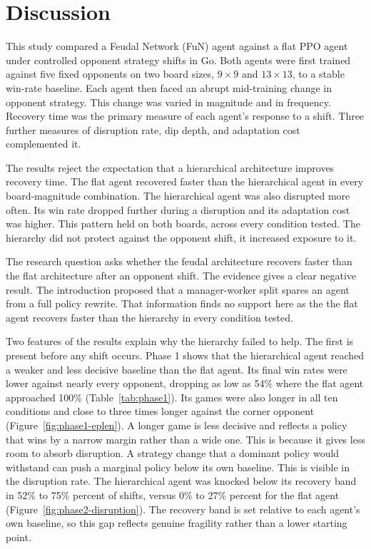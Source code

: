 \documentclass[sigconf,nonacm]{acmart}
\begin{document}
\section{Discussion}

This study compared a Feudal Network (FuN) agent against a flat PPO agent under controlled opponent strategy shifts in Go. Both agents were first trained against five fixed opponents on two board sizes, $9\times9$ and $13\times13$, to a stable win-rate baseline. Each agent then faced an abrupt mid-training change in opponent strategy. This change was varied in magnitude and in frequency. Recovery time was the primary measure of each agent's response to a shift. Three further measures of disruption rate, dip depth, and adaptation cost complemented it.

The results reject the expectation that a hierarchical architecture improves recovery time. The flat agent recovered faster than the hierarchical agent in every board-magnitude combination. The hierarchical agent was also disrupted more often. Its win rate dropped further during a disruption and its adaptation cost was higher. This pattern held on both boards, across every condition tested. The hierarchy did not protect against the opponent shift, it increased exposure to it.

\medskip

The research question asks whether the feudal architecture recovers faster than the flat architecture after an opponent shift. The evidence gives a clear negative result. The introduction proposed that a manager-worker split spares an agent from a full policy rewrite. That information finds no support here as the the flat agent recovers faster than the hierarchy in every condition tested.

\medskip

Two features of the results explain why the hierarchy failed to help. The first is present before any shift occurs. Phase 1 shows that the hierarchical agent reached a weaker and less decisive baseline than the flat agent. Its final win rates were lower against nearly every opponent, dropping as low as 54\% where the flat agent approached 100\% (Table~\ref{tab:phase1}). Its games were also longer in all ten conditions and close to three times longer against the corner opponent (Figure~\ref{fig:phase1-eplen}). A longer game is less decisive and reflects a policy that wins by a narrow margin rather than a wide one. This is because it gives less room to absorb disruption. A strategy change that a dominant policy would withstand can push a marginal policy below its own baseline. This is visible in the disruption rate. The hierarchical agent was knocked below its recovery band in 52\% to 75\% percent of shifts, versus 0\% to 27\% percent for the flat agent (Figure~\ref{fig:phase2-disruption}). The recovery band is set relative to each agent's own baseline, so this gap reflects genuine fragility rather than a lower starting point.
\end{document}
